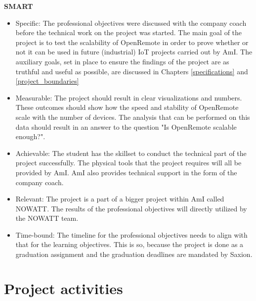 \documentclass{report}
\begin{document}
	\textbf{SMART}
	\begin{itemize}
		\item Specific: The professional objectives were discussed with the company coach before the technical work on the project was started. The main goal of the project is to test the scalability of OpenRemote in order to prove whether or not it can be used in future (industrial) IoT projects carried out by AmI. The auxiliary goals, set in place to ensure the findings of the project are as truthful and useful as possible, are discussed in Chapters \ref{specifications} and \ref{project_boundaries}
		\item Measurable: The project should result in clear visualizations and numbers. These outcomes should show how the speed and stability of OpenRemote scale with the number of devices. The analysis that can be performed on this data should result in an answer to the question "Is OpenRemote scalable enough?".  
		\item Achievable: The student has the skillset to conduct the technical part of the project successfully. The physical tools that the project requires will all be provided by AmI. AmI also provides technical support in the form of the company coach.
		\item Relevant: The project is a part of a bigger project within AmI called NOWATT. The results of the professional objectives will directly utilized by the NOWATT team. 
		\item Time-bound: The timeline for the professional objectives needs to align with that for the learning objectives. This is so, because the project is done as a graduation assignment and the graduation deadlines are mandated by Saxion.
	\end{itemize}
	
	
	
	
	\chapter{Project activities}
	
\end{document}
